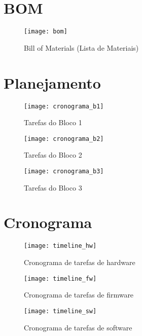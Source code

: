 \documentclass[../monografia.tex]{subfiles}
\begin{document}
\chapter{BOM}
\begin{figure}[h]
\centering
    \texttt{[image: bom]}
    \label{fig:img1}
    \caption{Bill of Materials (Lista de Materiais)}
\end{figure}

\chapter{Planejamento}

\begin{figure}[h]
    \centering
        \texttt{[image: cronograma\_b1]}
        \label{fig:b1}
        \caption{Tarefas do Bloco 1}
\end{figure}
\begin{figure}[h]
    \centering
        \texttt{[image: cronograma\_b2]}
        \label{fig:b2}
        \caption{Tarefas do Bloco 2}
\end{figure}
\begin{figure}[h]
    \centering
        \texttt{[image: cronograma\_b3]}
        \label{fig:b3}
        \caption{Tarefas do Bloco 3}
\end{figure}

\chapter{Cronograma}

\begin{figure}[h]
    \centering
        \texttt{[image: timeline\_hw]}
        \label{fig:hw}
        \caption{Cronograma de tarefas de hardware}
\end{figure}

\begin{figure}[h]
    \centering
        \texttt{[image: timeline\_fw]}
        \label{fig:fw}
        \caption{Cronograma de tarefas de firmware}
\end{figure}

\begin{figure}[h]
    \centering
        \texttt{[image: timeline\_sw]}
        \label{fig:sw}
        \caption{Cronograma de tarefas de software}
\end{figure}
\end{document}
